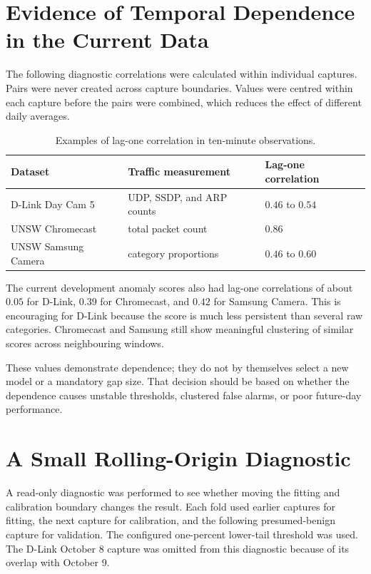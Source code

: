 \documentclass[11pt,a4paper]{article}
\begin{document}
\section{Evidence of Temporal Dependence in the Current Data}

The following diagnostic correlations were calculated within individual
captures. Pairs were never created across capture boundaries. Values were
centred within each capture before the pairs were combined, which reduces the
effect of different daily averages.

\begin{table}[ht]
\centering
\caption{Examples of lag-one correlation in ten-minute observations.}
\begin{tabular}{lll}
\toprule
Dataset & Traffic measurement & Lag-one correlation \\
\midrule
D-Link Day Cam 5 & UDP, SSDP, and ARP counts & $0.46$ to $0.54$ \\
UNSW Chromecast & total packet count & $0.86$ \\
UNSW Samsung Camera & category proportions & $0.46$ to $0.60$ \\
\bottomrule
\end{tabular}
\end{table}

The current development anomaly scores also had lag-one correlations of about
$0.05$ for D-Link, $0.39$ for Chromecast, and $0.42$ for Samsung Camera.
This is encouraging for D-Link because the score is much less persistent than
several raw categories. Chromecast and Samsung still show meaningful clustering
of similar scores across neighbouring windows.

These values demonstrate dependence; they do not by themselves select a new
model or a mandatory gap size. That decision should be based on whether the
dependence causes unstable thresholds, clustered false alarms, or poor
future-day performance.

\section{A Small Rolling-Origin Diagnostic}

A read-only diagnostic was performed to see whether moving the fitting and
calibration boundary changes the result. Each fold used earlier captures for
fitting, the next capture for calibration, and the following presumed-benign
capture for validation. The configured one-percent lower-tail threshold was
used. The D-Link October 8 capture was omitted from this diagnostic because of
its overlap with October 9.
\end{document}
